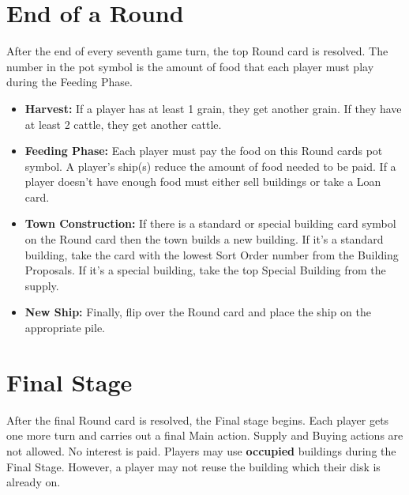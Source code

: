 \documentclass[12pt]{article}
\newenvironment{itemizeCustom}
{\begin{itemize}
  \setlength{\itemsep}{1pt}
  \setlength{\parskip}{0pt}
  \setlength{\parsep}{0pt}}
{\end{itemize}}
\begin{document}
\begin{multicols*}{2}
\section*{End of a Round}
After the end of every seventh game turn, the top Round card is resolved. The number in the pot symbol is the amount of food that each player must play during the Feeding Phase.
\begin{itemizeCustom}
	\item \textbf{Harvest:} If a player has at least 1 grain, they get another grain. If they have at least 2 cattle, they get another cattle.
	\item \textbf{Feeding Phase:} Each player must pay the food on this Round cards pot symbol. A player's ship(s) reduce the amount of food needed to be paid. If a player doesn't have enough food must either sell buildings or take a Loan card.
	\item \textbf{Town Construction:} If there is a standard or special building card symbol on the Round card then the town builds a new building. If it's a standard building, take the card with the lowest Sort Order number from the Building Proposals. If it's a special building, take the top Special Building from the supply.
	\item \textbf{New Ship:} Finally, flip over the Round card and place the ship on the appropriate pile.
\end{itemizeCustom}

\section*{Final Stage}
After the final Round card is resolved, the Final stage begins. Each player gets one more turn and carries out a final Main action. Supply and Buying actions are not allowed. No interest is paid. Players may use \textbf{occupied} buildings during the Final Stage. However, a player may not reuse the building which their disk is already on.

\end{multicols*}
\end{document}
